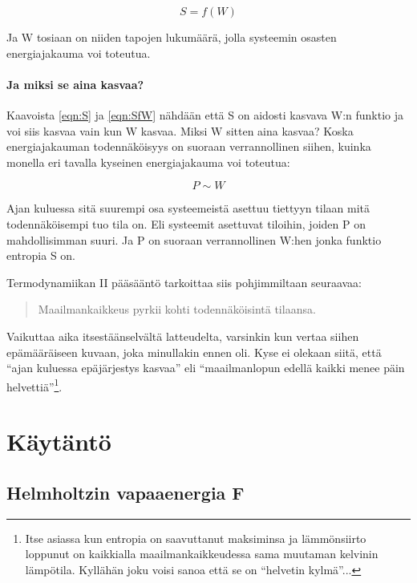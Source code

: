 \documentclass[12pt,a4paper,finnish]{book}
\begin{document}
\begin{equation}
\label{eqn:SfW}
 S = f(W)
\end{equation}

Ja W tosiaan on niiden tapojen lukumäärä, jolla systeemin osasten energiajakauma voi toteutua. 

\paragraph{Ja miksi se aina kasvaa?}

Kaavoista \ref{eqn:S} ja \ref{eqn:SfW} nähdään että S on aidosti kasvava W:n funktio ja voi siis 
kasvaa vain kun W kasvaa. Miksi W sitten aina kasvaa? Koska energiajakauman todennäköisyys 
on suoraan verrannollinen siihen, kuinka monella eri tavalla kyseinen energiajakauma voi toteutua:

\begin{equation}
 P \sim W
\end{equation}

Ajan kuluessa sitä suurempi osa systeemeistä asettuu tiettyyn tilaan mitä todennäköisempi tuo tila on.
Eli systeemit asettuvat tiloihin, joiden P on mahdollisimman suuri. Ja P on suoraan verrannollinen W:hen 
jonka funktio entropia S on.

Termodynamiikan II pääsääntö tarkoittaa siis pohjimmiltaan seuraavaa:

\begin{quote}
 Maailmankaikkeus pyrkii kohti todennäköisintä tilaansa.
\end{quote}

Vaikuttaa aika itsestäänselvältä latteudelta, varsinkin kun vertaa siihen epämääräiseen kuvaan, joka 
minullakin ennen oli. Kyse ei olekaan siitä, että ``ajan kuluessa epäjärjestys kasvaa'' eli 
``maailmanlopun edellä kaikki menee päin helvettiä''\footnote{Itse asiassa kun entropia on saavuttanut 
maksiminsa ja lämmönsiirto loppunut on kaikkialla maailmankaikkeudessa sama muutaman kelvinin lämpötila. 
Kyllähän joku voisi sanoa että se on ``helvetin kylmä''...}.


\section{Käytäntö} %

\subsection{Helmholtzin vapaaenergia F} \label{sssection:helmholtz}
\end{document}
